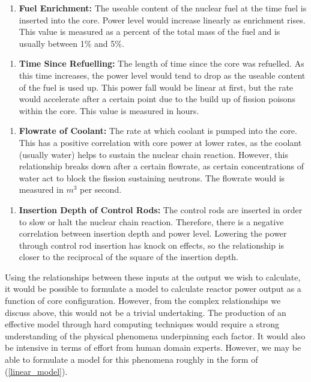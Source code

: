 
\begin{enumerate} [label=$x_1$]
	
	\item \textbf{Fuel Enrichment:} The useable content of the nuclear fuel at the time fuel is inserted into the core. Power level would increase linearly as enrichment rises. This value is measured as a percent of the total mass of the fuel and is usually between 1\% and 5\%.
	 

\end{enumerate}

\begin{enumerate} [label=$x_2$]
	
		\item \textbf{Time Since Refuelling:} The length of time since the core was refuelled. As this time increases, the power level would tend to drop as the useable content of the fuel is used up. This power fall would be linear at first, but the rate would accelerate  after a certain point due to the build up of fission poisons within the core. This value is measured in hours.

\end{enumerate}

\begin{enumerate} [label=$x_3$]
		
	\item  \textbf{Flowrate of Coolant:} The rate at which coolant is pumped into the core. This has a positive correlation with core power at lower rates, as the coolant (usually water) helps to sustain the nuclear chain reaction. However, this relationship breaks down after a certain flowrate, as certain concentrations of water act to block the fission sustaining neutrons. The flowrate would  is measured in $m^3$ per second.

\end{enumerate}

\begin{enumerate} [label=$x_4$]
	
	\item \textbf{Insertion Depth of Control Rods:} The control rods are inserted in order to slow or halt the nuclear chain reaction. Therefore, there is a negative correlation between insertion depth and power level. Lowering the power through control rod insertion has knock on effects, so the relationship is closer to the reciprocal of the square of the insertion depth.
	
\end{enumerate}
\noindent
Using the relationships between these inputs at the output we wish to calculate, it would be possible to formulate a model to calculate reactor power output as a function of core configuration. However, from the complex relationships we discuss above, this would not be a trivial undertaking. The production of an effective model through hard computing techniques would require a strong understanding of the physical phenomena underpinning each factor. It would also be intensive in terms of effort from human domain experts. However, we may be able to formulate a model for this phenomena roughly in the form of (\ref{linear_model}). \\

